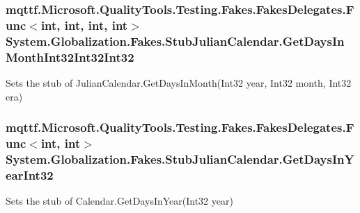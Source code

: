 \hypertarget{class_system_1_1_globalization_1_1_fakes_1_1_stub_julian_calendar_af06e404844ae76eb9e7dc1613c82c0f8}{
\subsubsection[{Get\-Days\-In\-Month\-Int32\-Int32\-Int32}]{\setlength{\rightskip}{0pt plus 5cm}mqttf.\-Microsoft.\-Quality\-Tools.\-Testing.\-Fakes.\-Fakes\-Delegates.\-Func$<$int, int, int, int$>$ System.\-Globalization.\-Fakes.\-Stub\-Julian\-Calendar.\-Get\-Days\-In\-Month\-Int32\-Int32\-Int32}}\label{class_system_1_1_globalization_1_1_fakes_1_1_stub_julian_calendar_af06e404844ae76eb9e7dc1613c82c0f8}


Sets the stub of Julian\-Calendar.\-Get\-Days\-In\-Month(\-Int32 year, Int32 month, Int32 era)

\hypertarget{class_system_1_1_globalization_1_1_fakes_1_1_stub_julian_calendar_ad3e6e4082e6f67e989d4aabb5bae9431}{
\subsubsection[{Get\-Days\-In\-Year\-Int32}]{\setlength{\rightskip}{0pt plus 5cm}mqttf.\-Microsoft.\-Quality\-Tools.\-Testing.\-Fakes.\-Fakes\-Delegates.\-Func$<$int, int$>$ System.\-Globalization.\-Fakes.\-Stub\-Julian\-Calendar.\-Get\-Days\-In\-Year\-Int32}}\label{class_system_1_1_globalization_1_1_fakes_1_1_stub_julian_calendar_ad3e6e4082e6f67e989d4aabb5bae9431}


Sets the stub of Calendar.\-Get\-Days\-In\-Year(\-Int32 year)

